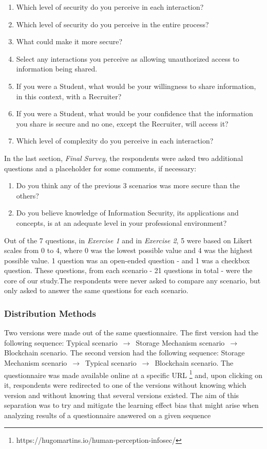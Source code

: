 \begin{enumerate}
	\item Which level of security do you perceive in each interaction?
	\item Which level of security do you perceive in the entire process?
	\item What could make it more secure?
	\item Select any interactions you perceive as allowing unauthorized access to information being shared.
	\item If you were a Student, what would be your willingness to share information, in this context, with a Recruiter?
	\item  If you were a Student, what would be your confidence that the information you share is secure and no one, except the Recruiter, will access it?
	\item Which level of complexity do you perceive in each interaction?
\end{enumerate}

In the last section, \textit{Final Survey}, the respondents were asked two additional questions and a placeholder for some comments, if necessary:

\begin{enumerate}
	\item Do you think any of the previous 3 scenarios was more secure than the others?
	\item Do you believe knowledge of Information Security, its applications and concepts, is at an adequate level in your professional environment?
\end{enumerate}

Out of the 7 questions, in \textit{Exercise 1} and in \textit{Exercise 2}, 5 were based on Likert scales from 0 to 4, where 0 was the lowest possible value and 4 was the highest possible value. 1 question was an open-ended question - and 1 was a checkbox question. These questions, from each scenario - 21 questions in total - were the core of our study.The respondents were never asked to compare any scenario, but only asked to answer the same questions for each scenario.

\subsubsection{Distribution Methods}

Two versions were made out of the same questionnaire. The first version had the following sequence: Typical scenario $\,\to\,$ Storage Mechanism scenario $\,\to\,$ Blockchain scenario. The second version had the following sequence: Storage Mechanism scenario $\,\to\,$ Typical scenario $\,\to\,$ Blockchain scenario. The questionnaire was made available online at a specific URL \footnote{https://hugomartins.io/human-perception-infosec/} and, upon clicking on it, respondents were redirected to one of the versions without knowing which version and without knowing that several versions existed. The aim of this separation was to try and mitigate the learning effect bias that might arise when analyzing results of a questionnaire answered on a given sequence

